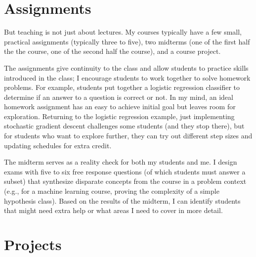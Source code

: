 
\section{Assignments}

But teaching is not just about lectures.  My courses typically have a
few small, practical assignments (typically three to five), two
midterms (one of the first half the the course, one of the second half
the course), and a course project.

The assignments give continuity to the class and allow students to
practice skills introduced in the class; I encourage students to work
together to solve homework problems.
%
For example, students put together a logistic regression classifier to
determine if an answer to a question is correct or not.  In my mind,
an ideal homework assignment has an easy to achieve initial goal but
leaves room for exploration.  Returning to the logistic regression
example, just implementing stochastic gradient descent challenges some
students (and they stop there), but for students who want to explore
further, they can try out different step sizes and updating schedules
for extra credit.

The midterm serves as a reality check for both my students and me.  I
design exams with five to six free response questions (of which
students must answer a subset) that synthesize disparate concepts from
the course in a problem context (e.g., for a machine learning course,
proving the  complexity of a simple hypothesis class).  Based
on the results of the midterm, I can identify students that might need
extra help or what areas I need to cover in more detail.

\section{Projects}

